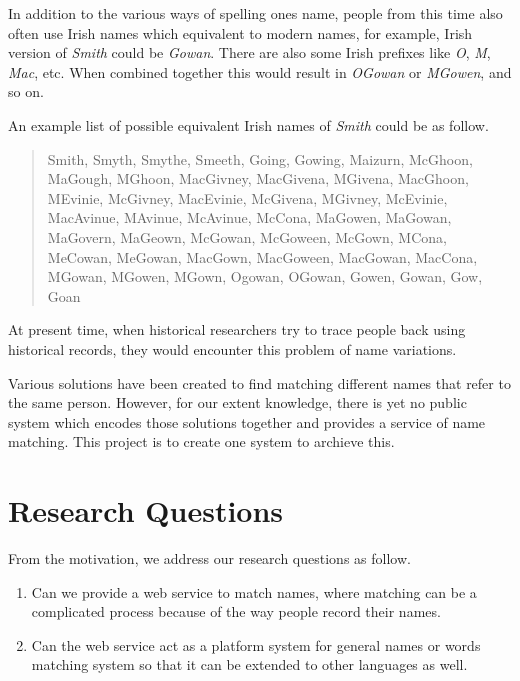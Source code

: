 In addition to the various ways of spelling one\textquotesingle s name,
people from this time also often use Irish names which equivalent to modern names,
for example, Irish version of \emph{Smith} could be \emph{Gowan}.
There are also some Irish prefixes like \emph{O\textquotesingle}, \emph{M\textquotesingle}, \emph{Mac},
etc. When combined together this would result in \emph{O\textquotesingle Gowan} or
\emph{M\textquotesingle Gowen}, and so on.

An example list of possible equivalent Irish names of \emph{Smith}
could be as follow.

\begin{quotation} \noindent
Smith, Smyth, Smythe, Smeeth, Going, Gowing, Maizurn, McGhoon, MaGough,
M\textquotesingle Ghoon, MacGivney, MacGivena, M\textquotesingle Givena,
MacGhoon, M\textquotesingle Evinie, McGivney, MacEvinie, McGivena,
M\textquotesingle Givney, McEvinie, MacAvinue, M\textquotesingle Avinue,
McAvinue, McCona, MaGowen, MaGowan, MaGovern, MaGeown, McGowan, McGoween,
McGown, M\textquotesingle Cona, MeCowan, MeGowan, MacGown, MacGoween,
MacGowan, MacCona, M\textquotesingle Gowan, M\textquotesingle Gowen,
M\textquotesingle Gown, Ogowan, O\textquotesingle Gowan, Gowen,
Gowan, Gow, Goan
\end{quotation}

At present time, when historical researchers try to trace people back
using historical records, they would encounter this problem of
name variations.

Various solutions have been created to find
matching different names that refer to the same person. However,
for our extent knowledge, there is yet no public system which encodes
those solutions together and provides a service of name matching.
This project is to create one system to archieve this.

\section{Research Questions}
\label{sec:rq}

From the motivation, we address our research questions as follow.

\begin{enumerate}
  \item Can we provide a web service to match names, where matching can be
    a complicated process because of the way people record their names.
  \item Can the web service act as a platform system for general names or words
    matching system so that it can be extended to other languages as well.
\end{enumerate}

